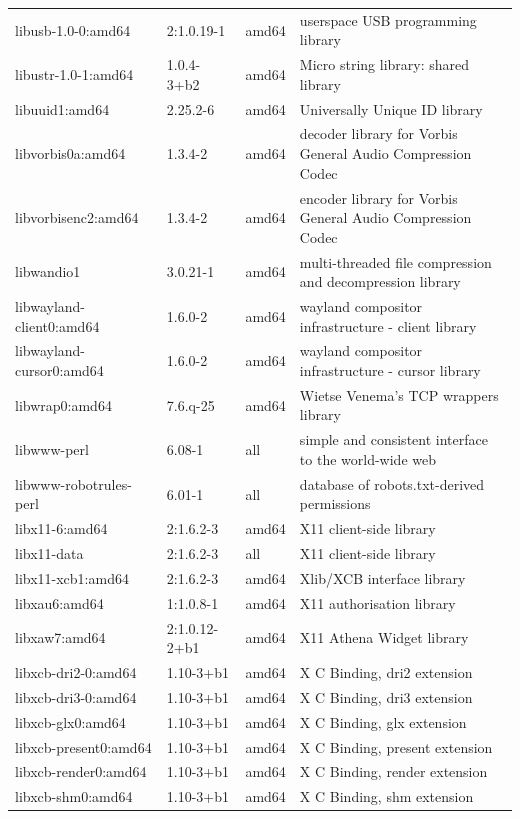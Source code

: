 \documentclass[a4paper,10pt]{article}
\begin{document}
\begin{appendices}
{\begin{longtable}{p{3.25cm}@{\hspace{0.25cm}}p{4cm}@{\hspace{0.25cm}}l@{\hspace{0.25cm}}p{7cm}}
libusb-1.0-0:amd64	&	2:1.0.19-1	&	amd64	&	userspace USB programming library	\\
libustr-1.0-1:amd64	&	1.0.4-3+b2	&	amd64	&	Micro string library: shared library	\\
libuuid1:amd64	&	2.25.2-6	&	amd64	&	Universally Unique ID library	\\
libvorbis0a:amd64	&	1.3.4-2	&	amd64	&	decoder library for Vorbis General Audio Compression Codec	\\
libvorbisenc2:amd64	&	1.3.4-2	&	amd64	&	encoder library for Vorbis General Audio Compression Codec	\\
libwandio1	&	3.0.21-1	&	amd64	&	multi-threaded file compression and decompression library	\\
libwayland-client0:amd64	&	1.6.0-2	&	amd64	&	wayland compositor infrastructure - client library	\\
libwayland-cursor0:amd64	&	1.6.0-2	&	amd64	&	wayland compositor infrastructure - cursor library	\\
libwrap0:amd64	&	7.6.q-25	&	amd64	&	Wietse Venema's TCP wrappers library	\\
libwww-perl	&	6.08-1	&	all	&	simple and consistent interface to the world-wide web	\\
libwww-robotrules-perl	&	6.01-1	&	all	&	database of robots.txt-derived permissions	\\
libx11-6:amd64	&	2:1.6.2-3	&	amd64	&	X11 client-side library	\\
libx11-data	&	2:1.6.2-3	&	all	&	X11 client-side library	\\
libx11-xcb1:amd64	&	2:1.6.2-3	&	amd64	&	Xlib/XCB interface library	\\
libxau6:amd64	&	1:1.0.8-1	&	amd64	&	X11 authorisation library	\\
libxaw7:amd64	&	2:1.0.12-2+b1	&	amd64	&	X11 Athena Widget library	\\
libxcb-dri2-0:amd64	&	1.10-3+b1	&	amd64	&	X C Binding, dri2 extension	\\
libxcb-dri3-0:amd64	&	1.10-3+b1	&	amd64	&	X C Binding, dri3 extension	\\
libxcb-glx0:amd64	&	1.10-3+b1	&	amd64	&	X C Binding, glx extension	\\
libxcb-present0:amd64	&	1.10-3+b1	&	amd64	&	X C Binding, present extension	\\
libxcb-render0:amd64	&	1.10-3+b1	&	amd64	&	X C Binding, render extension	\\
libxcb-shm0:amd64	&	1.10-3+b1	&	amd64	&	X C Binding, shm extension	\\

\end{longtable}}
\end{appendices}
\end{document}
